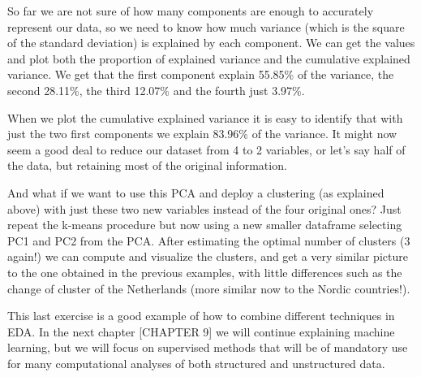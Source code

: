 
So far we are not sure of how many components are enough to accurately represent our data, so we need to know how much variance (which is the square of the standard deviation) is explained by each component. We can get the values and plot both the proportion of explained variance and the cumulative explained variance. We get that the first component explain 55.85\% of the variance, the second 28.11\%, the third 12.07\% and the fourth just 3.97\%. 


When we plot the cumulative explained variance it is easy to identify that with just the two first components we explain 83.96\% of the variance. It might now seem a good deal to reduce our dataset from 4 to 2 variables, or let’s say half of the data, but retaining most of the original information.


And what if we want to use this PCA and deploy a clustering (as explained above) with just these two new variables instead of the four original ones?  Just repeat the k-means procedure but now using a new smaller dataframe selecting PC1 and PC2 from the PCA. After estimating the optimal number of clusters (3 again!) we can compute and visualize the clusters, and get a very similar picture to the one obtained in the previous examples, with little differences such as the change of cluster of the Netherlands (more similar now to the Nordic countries!). 


This last exercise is a good example of how to combine different techniques in EDA. In the next chapter [CHAPTER 9] we will continue explaining machine learning, but we will focus on supervised methods that will be of mandatory use for many computational analyses of both structured and unstructured data.
